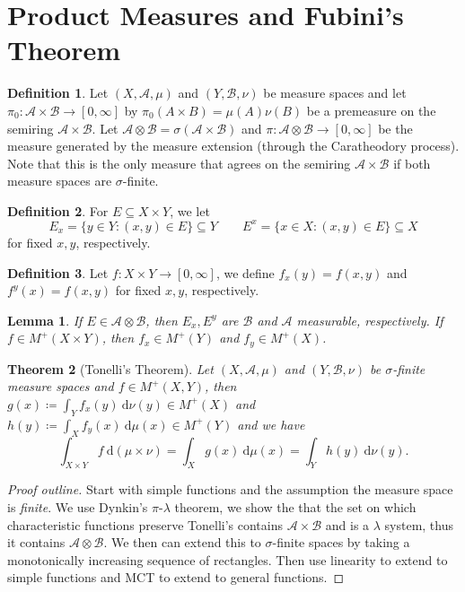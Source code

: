 \documentclass[letterpaper,12pt]{article}
\theoremstyle{definition}
\newtheorem{definition}{Definition}[section]
\theoremstyle{plain}
\newtheorem{thm}{Theorem}[section]
\newtheorem{lemma}[thm]{Lemma}
\theoremstyle{remark}
\begin{document}
\section{Product Measures and Fubini's Theorem}
\begin{definition}
Let $(X,\mathcal{A},\mu)$ and $(Y,\mathcal{B},\nu)$ be measure spaces and let $\pi_0:\mathcal{A}\times \mathcal{B}\to[0,\infty]$ by $\pi_0(A\times B) = \mu(A)\nu(B)$ be a premeasure on the semiring $\mathcal{A}\times \mathcal{B}$. Let $\mathcal{A}\otimes \mathcal{B} = \sigma(\mathcal{A}\times \mathcal{B})$ and $\pi:\mathcal{A}\otimes \mathcal{B}\to[0,\infty]$ be the measure generated by the measure extension (through the Caratheodory process). Note that this is the only measure that agrees on the semiring $\mathcal{A}\times \mathcal{B}$ if both measure spaces are $\sigma$-finite.
\end{definition}

\begin{definition}
For $E\subseteq X\times Y$, we let
\[E_x = \{y\in Y:(x,y)\in E\}\subseteq Y\qquad E^x = \{x\in X:(x,y)\in E\}\subseteq X\]
for fixed $x,y$, respectively.
\end{definition}

\begin{definition}
Let $f:X\times Y\to[0,\infty]$, we define $f_x(y) = f(x,y)$ and $f^y(x) = f(x,y)$ for fixed $x,y$, respectively.
\end{definition}

\begin{lemma}
If $E\in \mathcal{A}\otimes \mathcal{B}$, then $E_x,E^y$ are $\mathcal{B}$ and $\mathcal{A}$ measurable, respectively. If $f\in M^+(X\times Y)$, then $f_x\in M^+(Y)$ and $f_y\in M^+(X)$.
\end{lemma}

\begin{thm}[Tonelli's Theorem]
Let $(X,\mathcal{A},\mu)$ and $(Y,\mathcal{B},\nu)$ be $\sigma$-finite measure spaces and $f\in M^+(X,Y)$, then $g(x)\coloneqq \int_Y f_x(y)\ \mathrm{d}\nu(y)\in M^+(X)$ and $h(y)\coloneqq \int_X f_y(x)\ \mathrm{d}\mu(x)\in M^+(Y)$ and we have
\[\int_{X\times Y} f \ \mathrm{d}(\mu\times\nu) = \int_X g(x)\ \mathrm{d}\mu(x) = \int_Y h(y)\ \mathrm{d}\nu(y).\]
\end{thm}

\begin{proof}[Proof outline]
Start with simple functions and the assumption the measure space is \emph{finite}. We use Dynkin's $\pi$-$\lambda$ theorem, we show the that the set on which characteristic functions preserve Tonelli's contains $\mathcal{A}\times \mathcal{B}$ and is a $\lambda$ system, thus it contains $\mathcal{A}\otimes \mathcal{B}$. We then can extend this to $\sigma$-finite spaces by taking a monotonically increasing sequence of rectangles. Then use linearity to extend to simple functions and MCT to extend to general functions.
\end{proof}
\end{document}
